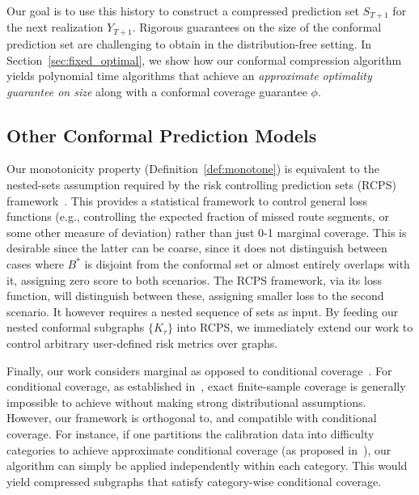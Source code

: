 Our goal is to use this history to construct a compressed prediction set $S_{T+1}$ for the next realization $Y_{T+1}$. Rigorous guarantees on the size of the conformal prediction set are challenging to obtain in the distribution-free setting. In Section~\ref{sec:fixed_optimal}, we show how our conformal compression algorithm
yields polynomial time algorithms that achieve an {\em approximate optimality guarantee on size} along with a conformal coverage guarantee $\phi$. 

\subsection{Other Conformal Prediction Models}
Our monotonicity property (Definition~\ref{def:monotone}) is equivalent to the nested-sets assumption required by the risk controlling prediction sets (RCPS) framework~\cite{Risk}. This provides a statistical framework to control general loss functions (e.g., controlling the expected fraction of missed route segments, or some other measure of deviation) rather than just 0-1 marginal coverage. This is desirable since the latter can be coarse, since it does not distinguish between cases where $B^*$ is disjoint from the conformal set or almost entirely overlaps with it, assigning zero score to both scenarios. The RCPS framework, via its loss function, will distinguish between these, assigning smaller loss to the second scenario. It however requires a nested sequence of sets as input. By feeding our nested conformal subgraphs $\{K_\tau\}$ into RCPS, we immediately extend our work to control arbitrary user-defined risk metrics over graphs.

Finally, our work considers marginal as opposed to conditional coverage~\cite{pmlr-v25-vovk12}. For conditional coverage, as established in~\cite{pmlr-v25-vovk12,lei2013distribution}, exact finite-sample coverage is generally impossible to achieve without making strong distributional assumptions. However, our framework is orthogonal to, and compatible with conditional coverage. For instance, if one partitions the calibration data into difficulty categories to achieve approximate conditional coverage (as proposed in~\cite{pmlr-v25-vovk12}), our algorithm can simply be applied independently within each category. This would yield compressed subgraphs that satisfy category-wise conditional coverage. 




